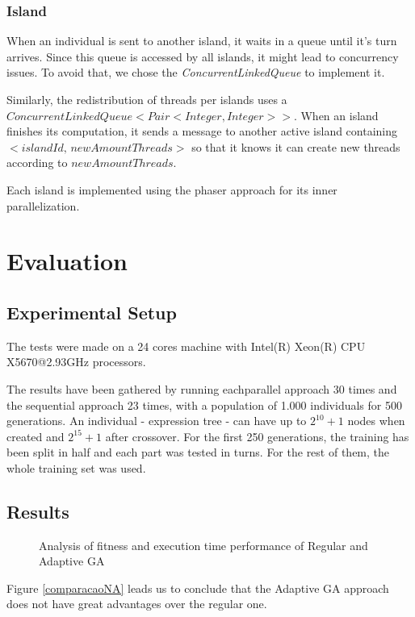\documentclass[runningheads]{llncs}
\begin{document}
\subsubsection{Island} \hfill \par

When an individual is sent to another island, it waits in a queue until it's turn arrives. Since this queue is accessed by all islands, it might lead to concurrency issues. To avoid that, we chose the \emph{ConcurrentLinkedQueue} to implement it.

Similarly, the redistribution of threads per islands uses a \(ConcurrentLinkedQueue<Pair<Integer, Integer>>\). When an island finishes its computation, it sends a message to another active island containing \(<islandId, \,newAmountThreads>\) so that it knows it can create new threads according to $newAmountThreads$.

Each island is implemented using the phaser approach for its inner parallelization.

\section{Evaluation}

\subsection{Experimental Setup}
The tests were made on a 24 cores machine with Intel(R) Xeon(R) CPU X5670@2.93GHz processors.

The results have been gathered by running eachparallel approach 30 times and the sequential approach 23 times, with a population of 1.000 individuals for 500 generations. An individual - expression tree - can have up to \(2^{10} + 1\) nodes when created and \(2^{15} + 1\) after crossover. For the first 250 generations, the training has been split in half and each part was tested in turns. For the rest of them, the whole training set was used.

\subsection{Results}
\begin{figure}[H]
\centering
{}%
\qquad
{}%
\caption{Analysis of fitness and execution time performance of Regular and Adaptive GA} \label{comparacaoNA}
\label{comparacaoImpl}%
\end{figure}
Figure \ref{comparacaoNA} leads us to conclude that the Adaptive GA approach does not have great advantages over the regular one.
\end{document}
